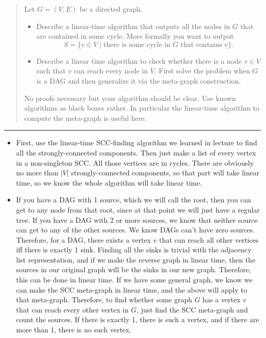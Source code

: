 \documentclass[11pt]{article}
\begin{document}

\begin{quote}
Let $G=(V,E)$ be a directed graph.
  \begin{itemize}
  \item Describe a linear-time algorithm that outputs all the nodes in
    $G$ that are contained in some cycle. More formally you want to
    output
    $$S = \{ v \in V \mid \text{there is some cycle in $G$ that
      contains v}\}.$$
  \item Describe a linear time algorithm to check whether there is a
    node $v \in V$ such that $v$ can reach every node in $V$. First
    solve the problem when $G$ is a DAG and then generalize it via the
    meta-graph construction.
  \end{itemize}
  No proofs necessary but your algorithm should be clear. Use known
  algorithms as black boxes rather. In particular the linear-time algorithm to
  compute the meta-graph is useful here.
\end{quote}
\hrule



\begin{solution}
    \begin{itemize}
        \item First, use the linear-time SCC-finding algorithm we learned in lecture to find all the strongly-connected components. Then just make a list of every vertex in a non-singleton SCC. All those vertices are in cycles. There are obviously no more than $|V|$ strongly-connected components, so that part will take linear time, so we know the whole algorithm will take linear time.
        \item If you have a DAG with 1 source, which we will call the root, then you can get to any node from that root, since at that point we will just have a regular tree. If you have a DAG with 2 or more sources, we know that neither source can get to any of the other sources. We know DAGs can't have zero sources. Therefore, for a DAG, there exists a vertex $v$ that can reach all other vertices iff there is exactly 1 sink. Finding all the sinks is trivial with the adjacency list representation, and if we make the reverse graph in linear time, then the sources in our original graph will be the sinks in our new graph. Therefore, this can be done in linear time. If we have some general graph, we know we can make the SCC meta-graph in linear time, and the above will apply to that meta-graph. Therefore, to find whether some graph $G$ has a vertex $v$ that can reach every other vertex in $G$, just find the SCC meta-graph and count the sources. If there is exactly 1, there is such a vertex, and if there are more than 1, there is no such vertex.
    \end{itemize}
\end{solution}
\end{document}
